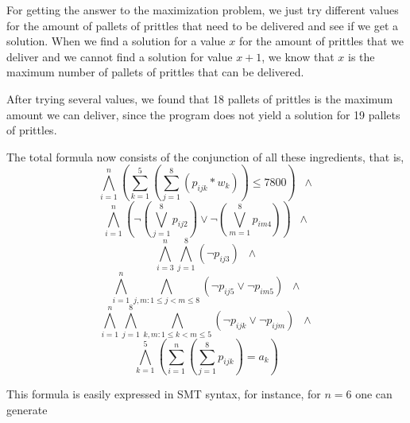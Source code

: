 \documentclass[a4paper]{article}
\begin{document}
For getting the answer to the maximization problem, we just try different values for the amount of pallets of prittles that need to be delivered and see if we get a solution. When we find a solution for a value $x$ for the amount of prittles that we deliver and we cannot find a solution for value $x+1$, we know that $x$ is the maximum number of pallets of prittles that can be delivered.

After trying several values, we found that 18 pallets of prittles is the maximum amount we can deliver, since the program does not yield a solution for 19 pallets of prittles.

The total formula now consists of the conjunction of all these ingredients, that is,
\[ \bigwedge_{i=1}^n (\sum_{k=1}^5 (\sum_{j=1}^8 (p_{ijk}*w_k)) \leq 7800) \;\; \wedge \]
\[ \bigwedge_{i=1}^n (\neg (\bigvee_{j=1}^8 p_{ij2}) \vee \neg (\bigvee_{m=1}^8 p_{im4})) \;\; \wedge \]
\[ \bigwedge_{i=3}^n \bigwedge_{j=1}^8 (\neg p_{ij3}) \;\; \wedge \]
\[ \bigwedge_{i=1}^n \bigwedge_{j,m:1 \leq j < m \leq 8} (\neg p_{ij5} \vee \neg p_{im5}) \;\; \wedge \]
\[ \bigwedge_{i=1}^n \bigwedge_{j=1}^8 \bigwedge_{k,m:1 \leq k < m \leq 5} (\neg p_{ijk} \vee \neg p_{ijm}) \;\; \wedge \]
\[ \bigwedge_{k=1}^5 ( \sum_{i=1}^n ( \sum_{j=1}^8 p_{ijk} ) = a_k) \]


This formula is easily expressed in SMT syntax, for instance, for
$n=6$ one can generate
\end{document}
